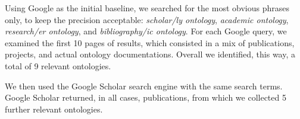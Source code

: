 Using Google as the initial baseline,
we 
searched for the most obvious phrases only, to keep the precision acceptable: \textit{scholar/ly ontology}, \textit{academic ontology}, \textit{research/er ontology}, and \textit{bibliography/ic ontology}.
For each Google query, we examined the first 10 pages of results, 
which consisted in a mix of publications, projects, and actual ontology documentations. %
Overall we identified, this way, a total of 9 relevant ontologies. 


We then used the Google Scholar search engine with the same search terms. 
Google Scholar returned, in all cases, publications, from which %
we  collected 5 further relevant ontologies.

